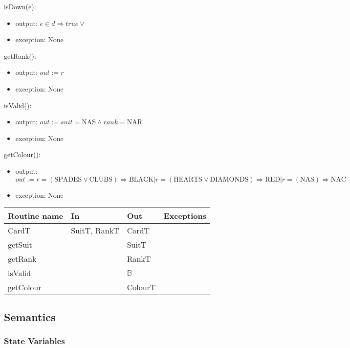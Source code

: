 \documentclass[12pt]{article}
\newcommand{\means}{\Rightarrow}
\newcommand{\m}[1]{\mbox{#1}}
\begin{document}
\noindent isDown(e):
\begin{itemize}
    \item output: $e \in d \Rightarrow true \lor $
    \item exception: None
\end{itemize}

\noindent getRank():
\begin{itemize}
    \item output: $out := r$
    \item exception: None
\end{itemize}

\noindent isValid():
\begin{itemize}
    \item output: $out := suit=\m{NAS} \land rank=\m{NAR}$
    \item exception: None
\end{itemize}

\noindent getColour():
\begin{itemize}
    \item output: $out := r=(\m{SPADES} \lor \m{CLUBS}) \means \m{BLACK} | r=(\m{HEARTS} \lor \m{DIAMONDS}) \means \m{RED} | r=(\m{NAS}) \means \m{NAC}$
    \item exception: None
\end{itemize}


\newpage %

\begin{tabular}{| l | l | l | l |}
\hline
\textbf{Routine name} & \textbf{In} & \textbf{Out} & \textbf{Exceptions}\\
\hline
CardT & SuitT, RankT & CardT & ~\\
\hline
getSuit & ~ & SuitT & ~\\
\hline
getRank & ~ & RankT & ~\\
\hline
isValid & ~ & $\mathbb{B}$ & ~\\
\hline
getColour & ~ & ColourT & ~\\
\hline
\end{tabular}

\subsection*{Semantics}

\subsubsection*{State Variables}
\end{document}
